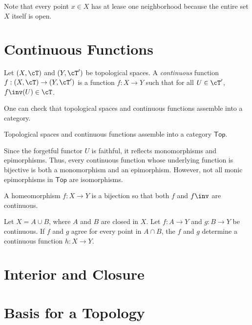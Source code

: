 \documentclass{amsart}
\begin{document}
Note that every point $x \in X$ has at lease one neighborhood because the entire set $X$ itself is open.

\section{Continuous Functions}
\label{sec:continuous-functions}

\begin{defn}
  Let $(X,\cT)$ and $(Y,\cT')$ be topological spaces.
  A \emph{continuous} function $f : (X,\cT) \to (Y,\cT')$ is a function $f : X \to Y$ such that for all $U \in \cT'$, $f\inv(U) \in \cT$.
\end{defn}
One can check that topological spaces and continuous functions assemble into a category.

\begin{lem}
  Topological spaces and continuous functions assemble into a category $\mathsf{Top}$.
\end{lem}

Since the forgetful functor $U$ is faithful, it reflects monomorphisms and epimorphisms.
Thus, every continuous function whose underlying function is bijective is both a monomorphism and an epimorphism.
However, not all monic epimorphisms in $\mathsf{Top}$ are isomorphisms.

\begin{defn}
  A homeomorphism $f : X \to Y$ is a bijection so that both $f$ and $f\inv$ are continuous.
\end{defn}

\begin{lem}
  Let $X = A \cup B$, where $A$ and $B$ are closed in $X$.
  Let $f : A \to Y$ and $g : B \to Y$ be continuous.
  If $f$ and $g$ agree for every point in $A \cap B$, the $f$ and $g$ determine a continuous function $h : X \to Y$.
\end{lem}

\section{Interior and Closure}
\label{sec:interior-and-closure}



\section{Basis for a Topology}
\label{sec:basis-for-a-topology}
\end{document}
